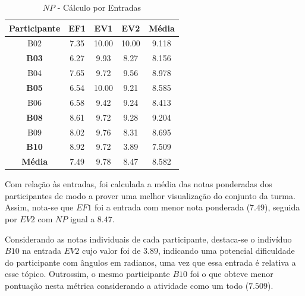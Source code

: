 \begin{table}[htbp]
	\centering
	\caption{$NP$ - Cálculo por Entradas}
	\begin{tabular}{|c|c|c|c|c|}
		\hline
		\rowcolor[HTML]{D0CECE} 
		\textbf{Participante} & \textbf{EF1} & \textbf{EV1} & \textbf{EV2} & \textbf{Média} \\ \hline
		B02                   & 7.35         & 10.00        & 10.00        & 9.118          \\ \hline
		\rowcolor[HTML]{F2F2F2} 
		\textbf{B03}          & 6.27         & 9.93         & 8.27         & 8.156          \\ \hline
		B04                   & 7.65         & 9.72         & 9.56         & 8.978          \\ \hline
		\rowcolor[HTML]{F2F2F2} 
		\textbf{B05}          & 6.54         & 10.00        & 9.21         & 8.585          \\ \hline
		B06                   & 6.58         & 9.42         & 9.24         & 8.413          \\ \hline
		\rowcolor[HTML]{F2F2F2} 
		\textbf{B08}          & 8.61         & 9.72         & 9.28         & 9.204          \\ \hline
		B09                   & 8.02         & 9.76         & 8.31         & 8.695          \\ \hline
		\rowcolor[HTML]{F2F2F2} 
		\textbf{B10}          & 8.92         & 9.72         & 3.89         & 7.509          \\ \hline
		\rowcolor[HTML]{D0CECE} 
		\textbf{Média}        & 7.49         & 9.78         & 8.47         & 8.582          \\ \hline
	\end{tabular}
	\label{tab:F3_A2_NP_ENTRADAS}
\end{table}

Com relação às entradas, foi calculada a média das notas ponderadas dos participantes de modo a prover uma melhor visualização do conjunto da turma. Assim, nota-se que $EF1$ foi a entrada com menor nota ponderada ($7.49$), seguida por $EV2$ com $NP$ igual a $8.47$.

Considerando as notas individuais de cada participante, destaca-se o indivíduo $B10$ na entrada $EV2$ cujo valor foi de $3.89$, indicando uma potencial dificuldade do participante com ângulos em radianos, uma vez que essa entrada é relativa a esse tópico. Outrossim, o mesmo participante $B10$ foi o que obteve menor pontuação nesta métrica considerando a atividade como um todo ($7.509$).

